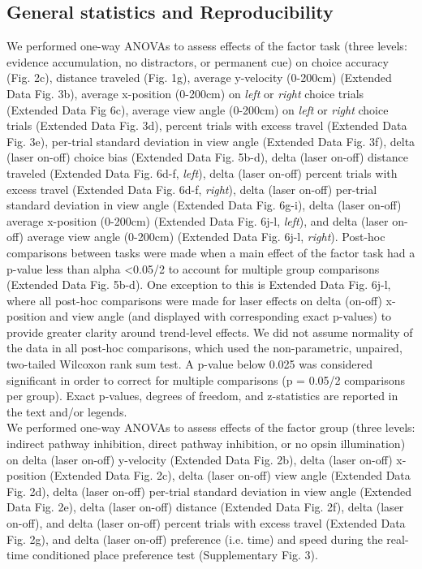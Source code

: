 \subsection{General statistics and Reproducibility}
\label{sec:ap1:m8}
We performed one-way ANOVAs to assess effects of the factor task (three levels: evidence accumulation, no distractors, or permanent cue) on choice accuracy (Fig. 2c), distance traveled (Fig. 1g), average y-velocity (0-200cm) (Extended Data Fig. 3b), average x-position (0-200cm) on \textit{left} or \textit{right} choice trials (Extended Data Fig 6c), average view angle (0-200cm) on \textit{left} or \textit{right} choice trials (Extended Data Fig. 3d), percent trials with excess travel (Extended Data Fig. 3e), per-trial standard deviation in view angle (Extended Data Fig. 3f), delta (laser on-off) choice bias (Extended Data Fig. 5b-d), delta (laser on-off) distance traveled (Extended Data Fig. 6d-f, \textit{left}), delta (laser on-off) percent trials with excess travel (Extended Data Fig. 6d-f, \textit{right}), delta (laser on-off) per-trial standard deviation in view angle (Extended Data Fig. 6g-i), delta (laser on-off) average x-position (0-200cm) (Extended Data Fig. 6j-l, \textit{left}), and delta (laser on-off) average view angle (0-200cm) (Extended Data Fig. 6j-l, \textit{right}). Post-hoc comparisons between tasks were made when a main effect of the factor task had a p-value less than alpha <0.05/2 to account for multiple group comparisons (Extended Data Fig. 5b-d). One exception to this is Extended Data Fig. 6j-l, where all post-hoc comparisons were made for laser effects on delta (on-off) x-position and view angle (and displayed with corresponding exact p-values) to provide greater clarity around trend-level effects. We did not assume normality of the data in all post-hoc comparisons, which used the non-parametric, unpaired, two-tailed Wilcoxon rank sum test. A p-value below 0.025 was considered significant in order to correct for multiple comparisons (p = 0.05/2 comparisons per group). Exact p-values, degrees of freedom, and z-statistics are reported in the text and/or legends. \\
We performed one-way ANOVAs to assess effects of the factor group (three levels: indirect pathway inhibition, direct pathway inhibition, or no opsin illumination) on delta (laser on-off) y-velocity (Extended Data Fig. 2b), delta (laser on-off) x-position (Extended Data Fig. 2c), delta (laser on-off) view angle (Extended Data Fig. 2d), delta (laser on-off) per-trial standard deviation in view angle (Extended Data Fig. 2e), delta (laser on-off) distance (Extended Data Fig. 2f), delta (laser on-off), and delta (laser on-off) percent trials with excess travel (Extended Data Fig. 2g), and delta (laser on-off) preference (i.e. time) and speed during the real-time conditioned place preference test (Supplementary Fig. 3). \\
